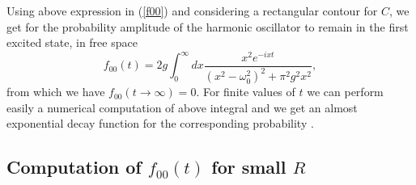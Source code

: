 \documentclass[10pt,english,twocolumn]{revtex4}
\begin{document}
Using above expression in (\ref{f00}) and considering a rectangular contour for $C$,  we get for the probability amplitude 
of the harmonic oscillator to remain in the first excited state, in free space \cite{gabrielsolo}
%
\begin{equation}
f_{00}(t)=2g\int_{0}^\infty dx\frac{x^2 e^{-ixt}}{(x^2-\omega_0^2)^2+\pi^2g^2x^2},
\label{Rtoinfty}
\end{equation}
from which we have $f_{00}(t\to\infty)=0$. For finite values of $t$ we can perform easily a numerical computation of above
integral and we get an almost exponential decay function for the corresponding probability \cite{gabrielsolo}. 

\subsection{Computation of $ f_{00}(t)$ for small $R$}
\end{document}
